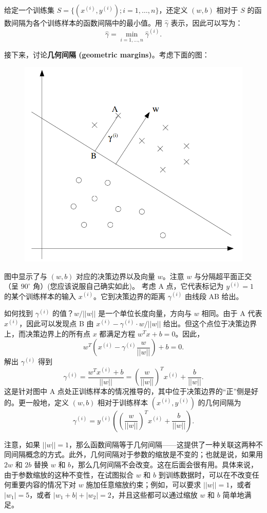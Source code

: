给定一个训练集 $S = \{(x^{(i)}, y^{(i)}); i = 1, \dots, n\}$，还定义 $(w,b)$ 相对于 $S$ 的函数间隔为各个训练样本的函数间隔中的最小值。用 $\hat{\gamma}$ 表示，因此可以写为：
\[
    \hat{\gamma} = \min_{i=1,\dots,n} \hat{\gamma}^{(i)}.
\]

接下来，讨论\textbf{几何间隔 (geometric margins)}。考虑下面的图：

\begin{figure}[H]
    \centering
    \includegraphics[width=0.5\linewidth]{figs/svm_geo_margin.png}
\end{figure}

图中显示了与 $(w,b)$ 对应的决策边界以及向量 $w$。注意 $w$ 与分隔超平面正交（呈 $90^\circ$ 角）(您应该说服自己确实如此)。 考虑 A 点，它代表标记为 $y^{(i)}=1$ 的某个训练样本的输入 $x^{(i)}$。它到决策边界的距离 $\gamma^{(i)}$ 由线段 AB 给出。

如何找到 $\gamma^{(i)}$ 的值？$w/||w||$ 是一个单位长度向量，方向与 $w$ 相同。由于 A 代表 $x^{(i)}$，因此可以发现点 B 由 $x^{(i)} - \gamma^{(i)} \cdot w/||w||$ 给出。但这个点位于决策边界上，而决策边界上的所有点 $x$ 都满足方程 $w^T x + b = 0$。因此，
\[
    w^T \left( x^{(i)} - \gamma^{(i)} \frac{w}{||w||} \right) + b = 0.
\]
解出 $\gamma^{(i)}$ 得到
\[
    \gamma^{(i)} = \frac{w^T x^{(i)} + b}{||w||} = \left(\frac{w}{||w||}\right)^T x^{(i)} + \frac{b}{||w||}.
\]
这是针对图中 A 点处正训练样本的情况推导的，其中位于决策边界的“正”侧是好的。更一般地，定义 $(w,b)$ 相对于训练样本 $(x^{(i)}, y^{(i)})$ 的几何间隔为
\[
    \gamma^{(i)} = y^{(i)} \left( \left(\frac{w}{||w||}\right)^T x^{(i)} + \frac{b}{||w||} \right).
\]

注意，如果 $||w|| = 1$，那么函数间隔等于几何间隔——这提供了一种关联这两种不同间隔概念的方式。此外，几何间隔对于参数的缩放是不变的；也就是说，如果用 $2w$ 和 $2b$ 替换 $w$ 和 $b$，那么几何间隔不会改变。这在后面会很有用。具体来说，由于参数缩放的这种不变性，在试图拟合 $w$ 和 $b$ 到训练数据时，可以在不改变任何重要内容的情况下对 $w$ 施加任意缩放约束；例如，可以要求 $||w|| = 1$，或者 $|w_1| = 5$，或者 $|w_1 + b| + |w_2| = 2$，并且这些都可以通过缩放 $w$ 和 $b$ 简单地满足。

